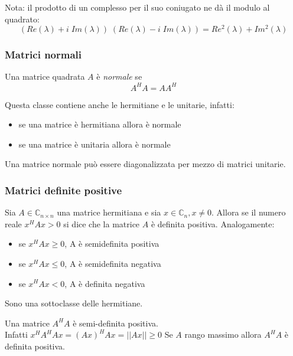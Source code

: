 Nota: il prodotto di un complesso per il suo coniugato ne dà il modulo
 al quadrato:
$$ (Re(\lambda) + i \; Im(\lambda)) \; (Re(\lambda) - i \; Im(\lambda)) = 
   Re^2(\lambda) + Im^2(\lambda)$$


\subsubsection{Matrici normali}
\begin{defn}
Una matrice quadrata $A$ \`e \emph{normale} se
$$ A^H A = A A^H $$
\end{defn}

Questa classe contiene anche le hermitiane e le unitarie, infatti:
\begin{itemize}
\item se una matrice \`e hermitiana allora \`e normale
\item se una matrice \`e unitaria allora \`e normale
\end{itemize}
\begin{property}
Una matrice normale pu\`o essere diagonalizzata per mezzo
di matrici unitarie.
\end{property}


\subsubsection{Matrici definite positive}
\begin{defn}
Sia $A \in \mathbb{C}_{n\times n}$ una matrice hermitiana e 
sia $x \in \mathbb{C}_n , x \neq 0$.
Allora se il numero reale $x^{H} Ax > 0$ si dice che la matrice $A$ \`e
definita positiva.
Analogamente:
\begin{itemize}
\item se $x^{H} Ax \geq 0$, \quad A \`e semidefinita positiva
\item se $x^{H} Ax \leq 0$, \quad A \`e semidefinita negativa
\item se $x^{H} Ax < 0$, \quad A \`e definita negativa
\end{itemize}
\end{defn}

Sono una sottoclasse delle hermitiane.

\begin{property}
\label{prop:def-pos}
Una matrice $A^{H}A$ \`e semi-definita positiva.\\
Infatti $x^{H}A^{H} Ax =(Ax)^{H} Ax = || Ax|| \geq 0$
Se $A$ rango massimo allora $A^{H}A$ è definita positiva.
\end{property}


